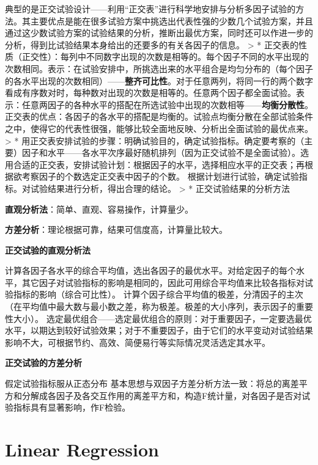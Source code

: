 \documentclass[]{ctexbook}
\begin{document}
典型的是正交试验设计------利用``正交表''进行科学地安排与分析多因子试验的方法。其主要优点是能在很多试验方案中挑选出代表性强的少数几个试验方案，并且通过这少数试验方案的试验结果的分析，推断出最优方案，同时还可以作进一步的分析，得到比试验结果本身给出的还要多的有关各因子的信息。
\textgreater{} * 正交表的性质（正交性）：每列中不同数字出现的次数是相等的。每个因子不同的水平出现的次数相同。表示：在试验安排中，所挑选出来的水平组合是均匀分布的（每个因子的各水平出现的次数相同）------\textbf{整齐可比性}。对于任意两列，将同一行的两个数字看成有序数对时，每种数对出现的次数是相等的。任意两个因子都全面试验。表示：任意两因子的各种水平的搭配在所选试验中出现的次数相等------\textbf{均衡分散性}。正交表的优点：各因子的各水平的搭配是均衡的。试验点均衡分散在全部试验条件之中，使得它的代表性很强，能够比较全面地反映、分析出全面试验的最优点来。
\textgreater{} * 用正交表安排试验的步骤：明确试验目的，确定试验指标。确定要考察的（主要）因子和水平------各水平次序最好随机排列（因为正交试验不是全面试验）。选用合适的正交表，安排试验计划：根据因子的水平，选择相应水平的正交表；再根据欲考察因子的个数选定正交表中因子的个数。
根据计划进行试验，确定试验指标。对试验结果进行分析，得出合理的结论。
\textgreater{} * 正交试验结果的分析方法

\textbf{直观分析法}：简单、直观、容易操作，计算量少。

\textbf{方差分析}：理论根据可靠，结果可信度高，计算量比较大。

\textbf{正交试验的直观分析法}

计算各因子各水平的综合平均值，选出各因子的最优水平。对给定因子的每个水平，其它因子对试验指标的影响是相同的，因此可用综合平均值来比较各指标对试验指标的影响（综合可比性）。
计算个因子综合平均值的极差，分清因子的主次（在平均值中最大数与最小数之差，称为极差。极差的大小序列，表示因子的重要性大小）。
选定最优组合------选定最优组合的原则：对于重要因子，一定要选最优水平，以期达到较好试验效果；对于不重要因子，由于它们的水平变动对试验结果影响不大，可根据节约、高效、简便易行等实际情况灵活选定其水平。

\textbf{正交试验的方差分析}

假定试验指标服从正态分布
基本思想与双因子方差分析方法一致：将总的离差平方和分解成各因子及各交互作用的离差平方和，构造F统计量，对各因子是否对试验指标具有显著影响，作F检验。

\hypertarget{regression}{%
\chapter{Linear Regression}\label{regression}}
\end{document}
